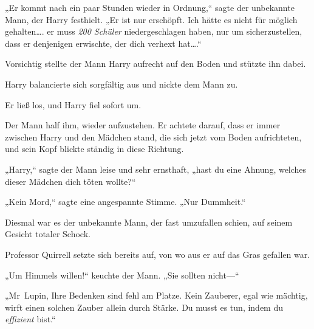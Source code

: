 „Er kommt nach ein paar Stunden wieder in Ordnung,“ sagte der unbekannte Mann, der Harry festhielt. „Er ist nur erschöpft. Ich hätte es nicht für möglich gehalten…. er muss \emph{200 Schüler} niedergeschlagen haben, nur um sicherzustellen, dass er denjenigen erwischte, der dich verhext hat….“

Vorsichtig stellte der Mann Harry aufrecht auf den Boden und stützte ihn dabei.

Harry balancierte sich sorgfältig aus und nickte dem Mann zu.

Er ließ los, und Harry fiel sofort um.

Der Mann half ihm, wieder aufzustehen. Er achtete darauf, dass er immer zwischen Harry und den Mädchen stand, die sich jetzt vom Boden aufrichteten, und sein Kopf blickte ständig in diese Richtung.

„Harry,“ sagte der Mann leise und sehr ernsthaft, „hast du eine Ahnung, welches dieser Mädchen dich töten wollte?“

„Kein Mord,“ sagte eine angespannte Stimme. „Nur Dummheit.“

Diesmal war es der unbekannte Mann, der fast umzufallen schien, auf seinem Gesicht totaler Schock.

Professor Quirrell setzte sich bereits auf, von wo aus er auf das Gras gefallen war.

„Um Himmels willen!“ keuchte der Mann. „Sie sollten nicht—“

„Mr~Lupin, Ihre Bedenken sind fehl am Platze. Kein Zauberer, egal wie mächtig, wirft einen solchen Zauber allein durch Stärke. Du musst es tun, indem du \emph{effizient} bist.“

